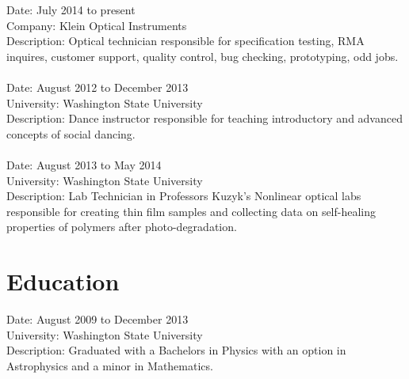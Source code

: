 \documentclass[8pt]{article}
\begin{document}
Date: July 2014 to present\\
Company: Klein Optical Instruments\\
Description: Optical technician responsible for specification testing, RMA inquires, customer support, quality control, bug checking, prototyping, odd jobs.
\\
\\
Date: August 2012 to December 2013\\
University: Washington State University\\
Description: Dance instructor responsible for teaching introductory and advanced concepts of social dancing.  
\\
\\
Date: August 2013 to May 2014\\
University: Washington State University\\
Description: Lab Technician in Professors Kuzyk's Nonlinear optical labs responsible for creating thin film samples and collecting data on self-healing properties of polymers after photo-degradation.

\section{Education}

Date: August 2009 to December 2013\\
University: Washington State University\\
Description: Graduated with a Bachelors in Physics with an option in Astrophysics and a minor in Mathematics.
  
\end{document}
